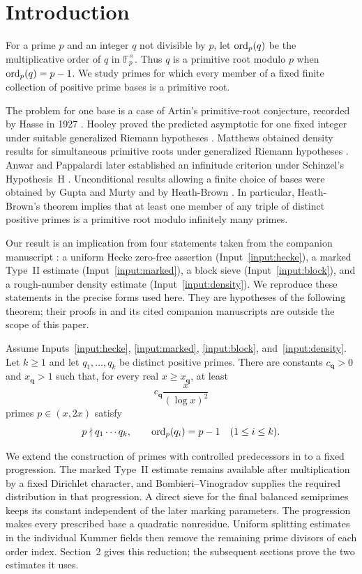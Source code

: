\section{Introduction}

For a prime \(p\) and an integer \(q\) not divisible by \(p\), let
\(\operatorname{ord}_p(q)\) be the multiplicative order of \(q\) in
\(\mathbb F_p^\times\).  Thus \(q\) is a primitive root modulo \(p\) when
\(\operatorname{ord}_p(q)=p-1\).  We study primes for which every member of a fixed finite
collection of positive prime bases is a primitive root.

The problem for one base is a case of Artin's primitive-root conjecture,
recorded by Hasse in 1927 \cite[Section~4.8]{HasseDiaries2012}.
Hooley proved the predicted asymptotic for one fixed integer under suitable
generalized Riemann hypotheses \cite{Hooley1967}.
Matthews obtained density results for simultaneous primitive roots under
generalized Riemann hypotheses \cite{Matthews1976}.  Anwar and Pappalardi
later established an infinitude criterion under Schinzel's Hypothesis~H
\cite{AnwarPappalardi2017}.
Unconditional results allowing a finite choice of bases were obtained by Gupta and Murty
\cite{GuptaMurty1984} and by Heath-Brown \cite{HeathBrown1986}.
In particular, Heath-Brown's theorem implies that at least one member of
any triple of distinct positive primes is a primitive root modulo
infinitely many primes.

Our result is an implication from four statements taken from the companion
manuscript \cite{PrimitiveRoot2}: a uniform Hecke zero-free assertion
(Input~\ref{input:hecke}), a marked Type~II estimate
(Input~\ref{input:marked}), a block sieve (Input~\ref{input:block}), and a
rough-number density estimate (Input~\ref{input:density}).  We reproduce
these statements in the precise forms used here.  They are hypotheses of
the following theorem; their proofs in \cite{PrimitiveRoot2} and its cited
companion manuscripts are outside the scope of this paper.

\begin{theorem}\label{thm:main}
Assume Inputs~\ref{input:hecke}, \ref{input:marked},
\ref{input:block}, and~\ref{input:density}.  Let \(k\ge1\) and let
\(q_1,\ldots,q_k\) be distinct positive primes.  There are constants
\(c_{\mathbf q}>0\) and \(x_{\mathbf q}>1\) such that, for every real
\(x\ge x_{\mathbf q}\), at least
\[
        c_{\mathbf q}\frac{x}{(\log x)^2}
\]
primes \(p\in(x,2x)\) satisfy
\[
        p\nmid q_1\cdots q_k,
        \qquad
        \operatorname{ord}_p(q_i)=p-1\quad(1\le i\le k).
\]
\end{theorem}

We extend the construction of primes with controlled predecessors in
\cite[Section~12]{PrimitiveRoot2} to a fixed progression.  The marked
Type~II estimate remains available after multiplication by a fixed
Dirichlet character, and Bombieri--Vinogradov supplies the required
distribution in that progression.  A direct sieve for the final balanced
semiprimes keeps its constant independent of the later marking parameters.
The progression makes every prescribed base a quadratic nonresidue.
Uniform splitting estimates in the individual Kummer fields then remove
the remaining prime divisors of each order index.  Section~2 gives this
reduction; the subsequent sections prove the two estimates it uses.
